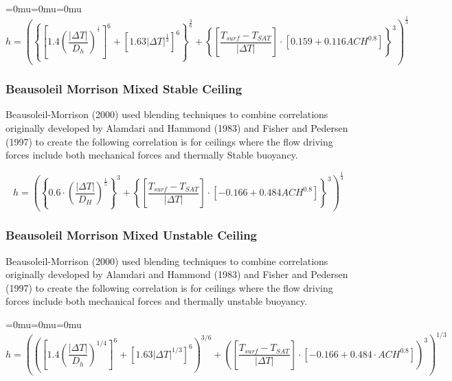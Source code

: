 {\medmuskip=0mu\thinmuskip=0mu\thickmuskip=0mu\nulldelimiterspace=0pt\scriptspace=0pt
\begin{equation}
h = {\left( {{{\left\{ {{{\left[ {1.4{{\left( {\frac{{\left| {\Delta T} \right|}}{{{D_h}}}} \right)}^{^{{\frac{1}{4}}}}}} \right]}^6} + {{\left[ {1.63{{\left| {\Delta T} \right|}^{{\frac{1}{3}}}}} \right]}^6}} \right\}}^{{\frac{3}{6}}}} + {{\left\{ {\left[ {\frac{{{T_{surf}} - {T_{SAT}}}}{{\left| {\Delta T} \right|}}} \right]\cdot\left[ {0.159 + 0.116AC{H^{0.8}}} \right]} \right\}}^3}} \right)^{{\frac{1}{3}}}}
\end{equation}}

\subsubsection{Beausoleil Morrison Mixed Stable Ceiling}\label{beausoleil-morrison-mixed-stable-ceiling}

Beausoleil-Morrison (2000) used blending techniques to combine correlations originally developed by Alamdari and Hammond (1983) and Fisher and Pedersen (1997) to create the following correlation is for ceilings where the flow driving forces include both mechanical forces and thermally Stable buoyancy.

\begin{equation}
h = {\left( {{{\left\{ {0.6 \cdot {{\left( {\frac{{\left| {\Delta T} \right|}}{{{D_H}}}} \right)}^{{\frac{1}{5}}}}} \right\}}^3} + {{\left\{ {\left[ {\frac{{{T_{surf}} - {T_{SAT}}}}{{\left| {\Delta T} \right|}}} \right]\cdot\left[ { - 0.166 + 0.484AC{H^{0.8}}} \right]} \right\}}^3}} \right)^{{\frac{1}{3}}}}
\end{equation}

\subsubsection{Beausoleil Morrison Mixed Unstable Ceiling}\label{beausoleil-morrison-mixed-unstable-ceiling}

Beausoleil-Morrison (2000) used blending techniques to combine correlations originally developed by Alamdari and Hammond (1983) and Fisher and Pedersen (1997) to create the following correlation is for ceilings where the flow driving forces include both mechanical forces and thermally unstable buoyancy.

{\medmuskip=0mu\thinmuskip=0mu\thickmuskip=0mu\nulldelimiterspace=0pt\scriptspace=0pt
\begin{equation}
h = \left(
   \left(
    \left[
     1.4 \left(
      \frac{
       \left|
        \Delta T
       \right|
      }{
       D_h
      }
     \right)^{1/4}
    \right]^6 +
    \left[
     1.63 \left|\Delta T\right|^{1/3}
    \right]^6
   \right)^{3/6} +
   \left(
    \left[
     \frac{
      T_{surf}-T_{SAT}
     }{
      \left|\Delta T\right|
     }
    \right]
    \cdot
    \left[
     -0.166 + 0.484 \cdot ACH^{0.8}
    \right]
   \right)^3
  \right)^{1/3}
\end{equation}}

